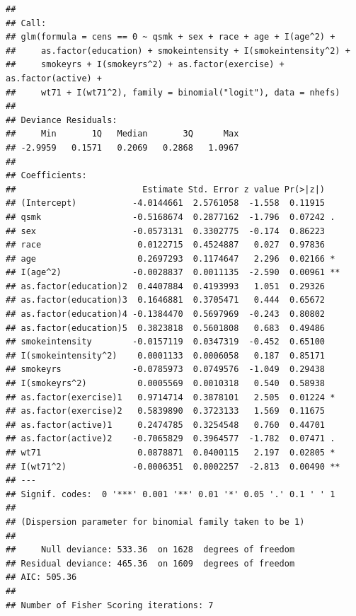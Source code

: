 \documentclass[
  10pt,
]{book}
\newenvironment{Shaded}{\begin{snugshade}}{\end{snugshade}}
\newcommand{\CommentTok}[1]{\textcolor[rgb]{0.56,0.35,0.01}{\textit{#1}}}
\newcommand{\DataTypeTok}[1]{\textcolor[rgb]{0.13,0.29,0.53}{#1}}
\newcommand{\DecValTok}[1]{\textcolor[rgb]{0.00,0.00,0.81}{#1}}
\newcommand{\KeywordTok}[1]{\textcolor[rgb]{0.13,0.29,0.53}{\textbf{#1}}}
\newcommand{\NormalTok}[1]{#1}
\newcommand{\OperatorTok}[1]{\textcolor[rgb]{0.81,0.36,0.00}{\textbf{#1}}}
\newcommand{\OtherTok}[1]{\textcolor[rgb]{0.56,0.35,0.01}{#1}}
\newcommand{\StringTok}[1]{\textcolor[rgb]{0.31,0.60,0.02}{#1}}
\begin{document}
\begin{verbatim}
## 
## Call:
## glm(formula = cens == 0 ~ qsmk + sex + race + age + I(age^2) + 
##     as.factor(education) + smokeintensity + I(smokeintensity^2) + 
##     smokeyrs + I(smokeyrs^2) + as.factor(exercise) + as.factor(active) + 
##     wt71 + I(wt71^2), family = binomial("logit"), data = nhefs)
## 
## Deviance Residuals: 
##     Min       1Q   Median       3Q      Max  
## -2.9959   0.1571   0.2069   0.2868   1.0967  
## 
## Coefficients:
##                         Estimate Std. Error z value Pr(>|z|)   
## (Intercept)           -4.0144661  2.5761058  -1.558  0.11915   
## qsmk                  -0.5168674  0.2877162  -1.796  0.07242 . 
## sex                   -0.0573131  0.3302775  -0.174  0.86223   
## race                   0.0122715  0.4524887   0.027  0.97836   
## age                    0.2697293  0.1174647   2.296  0.02166 * 
## I(age^2)              -0.0028837  0.0011135  -2.590  0.00961 **
## as.factor(education)2  0.4407884  0.4193993   1.051  0.29326   
## as.factor(education)3  0.1646881  0.3705471   0.444  0.65672   
## as.factor(education)4 -0.1384470  0.5697969  -0.243  0.80802   
## as.factor(education)5  0.3823818  0.5601808   0.683  0.49486   
## smokeintensity        -0.0157119  0.0347319  -0.452  0.65100   
## I(smokeintensity^2)    0.0001133  0.0006058   0.187  0.85171   
## smokeyrs              -0.0785973  0.0749576  -1.049  0.29438   
## I(smokeyrs^2)          0.0005569  0.0010318   0.540  0.58938   
## as.factor(exercise)1   0.9714714  0.3878101   2.505  0.01224 * 
## as.factor(exercise)2   0.5839890  0.3723133   1.569  0.11675   
## as.factor(active)1     0.2474785  0.3254548   0.760  0.44701   
## as.factor(active)2    -0.7065829  0.3964577  -1.782  0.07471 . 
## wt71                   0.0878871  0.0400115   2.197  0.02805 * 
## I(wt71^2)             -0.0006351  0.0002257  -2.813  0.00490 **
## ---
## Signif. codes:  0 '***' 0.001 '**' 0.01 '*' 0.05 '.' 0.1 ' ' 1
## 
## (Dispersion parameter for binomial family taken to be 1)
## 
##     Null deviance: 533.36  on 1628  degrees of freedom
## Residual deviance: 465.36  on 1609  degrees of freedom
## AIC: 505.36
## 
## Number of Fisher Scoring iterations: 7
\end{verbatim}

\begin{Shaded}
\end{Shaded}
\end{document}
